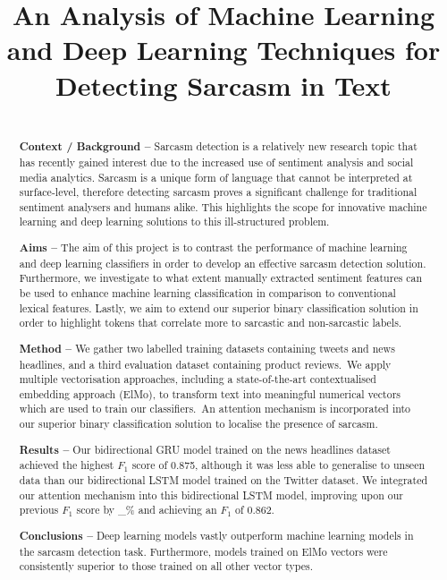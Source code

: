 \documentclass[12pt,a4paper]{article}
\title{An Analysis of Machine Learning and Deep Learning Techniques for Detecting Sarcasm in Text}
\author{} %
\date{}
\begin{document}
	
\maketitle

\begin{abstract}
\\ \noindent \textbf{Context / Background --} 
Sarcasm detection is a relatively new research topic that has recently gained interest due to the increased use of sentiment analysis and social media analytics. Sarcasm is a unique form of language that cannot be interpreted at surface-level, therefore detecting sarcasm proves a significant challenge for traditional sentiment analysers and humans alike. This highlights the scope for innovative machine learning and deep learning solutions to this ill-structured problem.\vspace{5pt}

\noindent \textbf{Aims --} The aim of this project is to contrast the performance of machine learning and deep learning classifiers in order to develop an effective sarcasm detection solution. Furthermore, we investigate to what extent manually extracted sentiment features can be used to enhance machine learning classification in comparison to conventional lexical features. Lastly, we aim to extend our superior binary classification solution in order to highlight tokens that correlate more to sarcastic and non-sarcastic labels.\vspace{5pt}

\noindent \textbf{Method --} We gather two labelled training datasets containing tweets and news headlines, and a third evaluation dataset containing product reviews.\ We apply multiple vectorisation approaches, including a state-of-the-art contextualised embedding approach (ElMo), to transform text into meaningful numerical vectors which are used to train our classifiers.\ An attention mechanism is incorporated into our superior binary classification solution to localise the presence of sarcasm.\vspace{5pt}

\noindent \textbf{Results --} Our bidirectional GRU model trained on the news headlines dataset achieved the highest $F_1$ score of 0.875, although it was less able to generalise to unseen data than our bidirectional LSTM model trained on the Twitter dataset. We integrated our attention mechanism into this bidirectional LSTM model, improving upon our previous $F_1$ score by \_\% and achieving an $F_1$ of 0.862.\vspace{5pt}


\noindent \textbf{Conclusions --} Deep learning models vastly outperform machine learning models in the sarcasm detection task. Furthermore, models trained on ElMo vectors were consistently superior to those trained on all other vector types.

\end{abstract}
\end{document}
